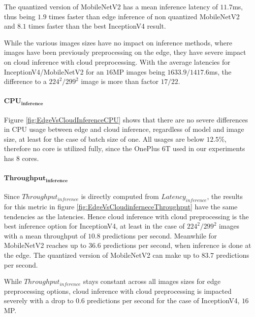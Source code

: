 The quantized version of MobileNetV2 has a mean inference latency of $11.7$ms, thus being $1.9$ times faster than edge inference of non quantized MobileNetV2 and $8.1$ times faster than the best InceptionV4 result.

While the various images sizes have no impact on inference methods, where images have been previously preprocessing on the edge, they have severe impact on cloud inference with cloud preprocessing.
With the average latencies for InceptionV4/MobileNetV2 for an $16$MP images being $1633.9/1417.6$ms, the difference to a $224^2/299^2$ image is more than factor $17/22$.

\paragraph{$\mathbf{CPU_{inference}}$}
Figure \ref{fig:EdgeVsCloudInferenceCPU} shows that there are no severe differences in CPU usage between edge and cloud inference, regardless of model and image size, at least for the case of batch size of one.
All usages are below $12.5\%$, therefore no core is utilized fully, since the OnePlus 6T used in our experiments has $8$ cores.


\paragraph{$\mathbf{Throughput_{inference}}$}
Since $Throughput_{inference}$ is directly computed from $Latency_{inference}$, the results for this metric in figure \ref{fig:EdgeVsCloudinferneceThroughput} have the same tendencies as the latencies.
Hence cloud inference with cloud preprocessing is the best inference option for InceptionV4, at least in the case of $224^2/299^2$ images with a mean throughput of $10.8$ predictions per second.
Meanwhile for MobileNetV2 reaches up to $36.6$ predictions per second, when inference is done at the edge.
The quantized version of MobileNetV2 can make up to $83.7$ predictions per second.

While $Throughput_{inference}$ stays constant across all images sizes for edge preprocessing options, cloud inference with cloud preprocessing is impacted severely with a drop to $0.6$ predictions per second for the case of InceptionV4, $16$MP.


